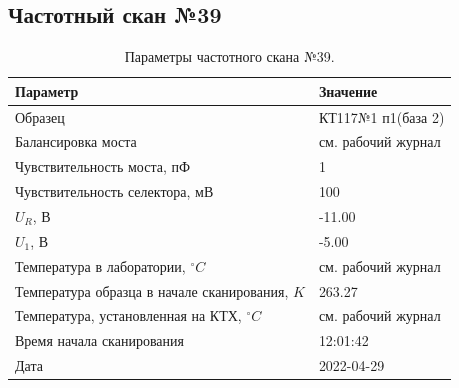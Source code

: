 \subsection{Частотный скан №39}
\begin{table}[!ht]
    \centering
    \caption{Параметры частотного скана №39.}
    \begin{tabular}{|l|l|}
        \hline
        Параметр                                       & Значение                  \\ \hline
        Образец                                        & КТ117№1 п1(база 2)        \\ \hline
        Балансировка моста                             & см. рабочий журнал        \\ \hline
        Чувствительность моста, пФ                     & 1                         \\ \hline
        Чувствительность селектора, мВ                 & 100                       \\ \hline
        $U_R$, В                                       & -11.00                    \\ \hline
        $U_1$, В                                       & -5.00                     \\ \hline
        Температура в лаборатории, $^\circ C$          & см. рабочий журнал        \\ \hline
        Температура образца в начале сканирования, $K$ & 263.27                    \\ \hline
        Температура, установленная на КТХ, $^\circ C$  & см. рабочий журнал        \\ \hline
        Время начала сканирования                      & 12:01:42                  \\ \hline
        Дата                                           & 2022-04-29                \\ \hline
    \end{tabular}
    \label{table:frequency_scan_39}
\end{table}

